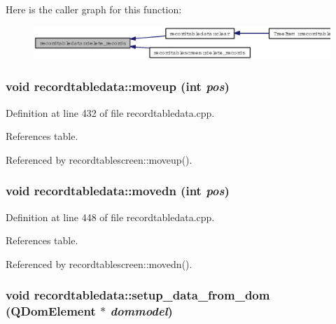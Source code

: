 Here is the caller graph for this function:\begin{figure}[H]
\begin{center}
\leavevmode
\includegraphics[width=399pt]{classrecordtabledata_70252d36c2700c65a072d4c1290d2d52_icgraph}
\end{center}
\end{figure}
\subsubsection{\setlength{\rightskip}{0pt plus 5cm}void recordtabledata::moveup (int {\em pos})}\label{classrecordtabledata_077ca508e4d7b39ff7890409650ef4d2}




Definition at line 432 of file recordtabledata.cpp.

References table.

Referenced by recordtablescreen::moveup().
\subsubsection{\setlength{\rightskip}{0pt plus 5cm}void recordtabledata::movedn (int {\em pos})}\label{classrecordtabledata_ba8cc1322d315f7c7e310dff74d15053}




Definition at line 448 of file recordtabledata.cpp.

References table.

Referenced by recordtablescreen::movedn().
\subsubsection{\setlength{\rightskip}{0pt plus 5cm}void recordtabledata::setup\_\-data\_\-from\_\-dom (QDom\-Element $\ast$ {\em dommodel})\hspace{0.3cm}{\tt  [private]}}\label{classrecordtabledata_859f66d9b583fcc73fa8011b310d4f39}




